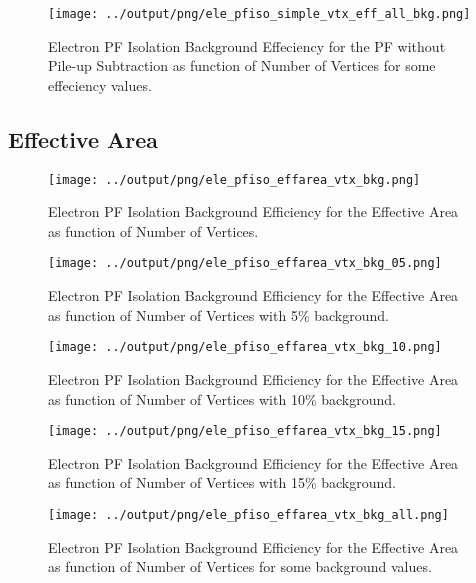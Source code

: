 \documentclass[11pt]{book}
\begin{document}
\begin{figure}[htb]
\centering
\texttt{[image: ../output/png/ele\_pfiso\_simple\_vtx\_eff\_all\_bkg.png]}
\caption{Electron PF Isolation Background Effeciency for the PF without Pile-up Subtraction as function of Number of Vertices for some effeciency values.}
\label{fig:ele_pfiso_vtx_eff_simple_eff_all_bkg}
\end{figure}
\clearpage

\subsection{Effective Area}
\begin{figure}[htb]
\centering
\texttt{[image: ../output/png/ele\_pfiso\_effarea\_vtx\_bkg.png]}
\caption{Electron PF Isolation Background Efficiency for the Effective Area as function of Number of Vertices.}
\label{fig:ele_pfiso_vtx_bkg_effarea}
\end{figure}

\begin{figure}[htb]
\centering
\texttt{[image: ../output/png/ele\_pfiso\_effarea\_vtx\_bkg\_05.png]}
\caption{Electron PF Isolation Background Efficiency for the Effective Area as function of Number of Vertices with 5\% background.}
\label{fig:ele_pfiso_vtx_bkg_effarea_bkg_05}
\end{figure}

\begin{figure}[htb]
\centering
\texttt{[image: ../output/png/ele\_pfiso\_effarea\_vtx\_bkg\_10.png]}
\caption{Electron PF Isolation Background Efficiency for the Effective Area as function of Number of Vertices with 10\% background.}
\label{fig:ele_pfiso_vtx_bkg_effarea_bkg_10}
\end{figure}

\begin{figure}[htb]
\centering
\texttt{[image: ../output/png/ele\_pfiso\_effarea\_vtx\_bkg\_15.png]}
\caption{Electron PF Isolation Background Efficiency for the Effective Area as function of Number of Vertices with 15\% background.}
\label{fig:ele_pfiso_vtx_bkg_effarea_bkg_15}
\end{figure}

\begin{figure}[htb]
\centering
\texttt{[image: ../output/png/ele\_pfiso\_effarea\_vtx\_bkg\_all.png]}
\caption{Electron PF Isolation Background Efficiency for the Effective Area as function of Number of Vertices for some background values.}
\label{fig:ele_pfiso_vtx_bkg_effarea_bkg_all}
\end{figure}
\end{document}
